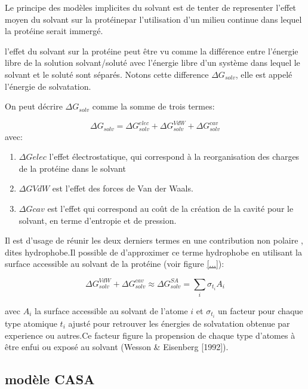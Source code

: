 Le principe des modèles implicites du solvant est de tenter de representer l'effet moyen du solvant sur la protéinepar l'utilisation d'un milieu continue dans lequel la protéine serait immergé.

l'effet du solvant sur la protéine peut être vu comme la différence entre l'énergie libre  de la solution solvant/soluté avec l'énergie libre  d'un système dans lequel le solvant et le soluté sont séparés. Notons cette difference $\Delta G_{solv}$, elle est appelé l'énergie de solvatation.

On peut décrire $\Delta G_{solv}$ comme la somme de trois termes:

\begin{equation}
  \Delta G_{solv} = \Delta G_{solv}^{elec} + \Delta G_{solv}^{VdW} + \Delta G_{solv}^{cav}
\end{equation}
avec:

\begin{enumerate}
\item $\Delta G{elec}$ l'effet électrostatique, qui correspond à la reorganisation des charges de la protéine dans le solvant
\item $\Delta G{VdW}$ est l'effet des forces de Van der Waals.
  \item $\Delta G{cav}$ est l'effet qui correspond au coût de la création de la cavité pour le solvant, en terme d'entropie et de pression.
\end{enumerate}

Il est d'usage de réunir les deux derniers termes en une contribution non polaire , dites hydrophobe.Il possible de d'approximer ce  terme hydrophobe en utilisant la surface accessible au solvant de la protéine (voir figure \ref{...}):

\begin{equation}
\Delta G_{solv}^{VdW} + \Delta G_{solv}^{cav} \approx \Delta G_{solv}^{SA} = \sum_i \sigma_{t_i} A_i
\end{equation}

avec $A_i$ la surface accessible au solvant  de l'atome $i$ et $\sigma_{t_i}$ un facteur pour chaque type atomique $t_i$ ajusté pour retrouver les énergies de solvatation obtenue par experience ou autres.Ce facteur figure la propension de chaque type d'atomes à être enfui ou exposé au solvant (Wesson & Eisenberg [1992]).


\subsection{modèle CASA}


